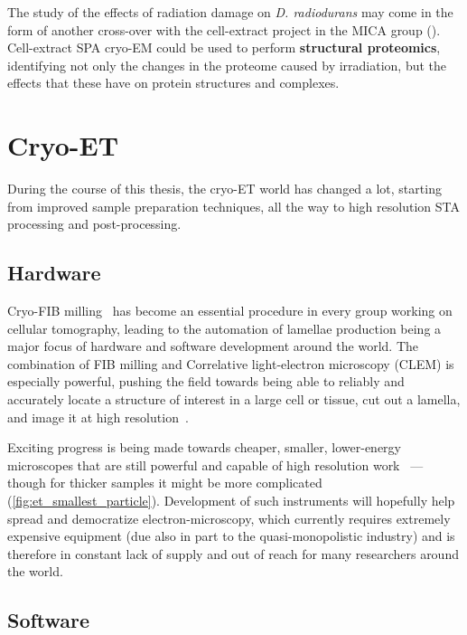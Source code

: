 The study of the effects of radiation damage on \textit{D. radiodurans} may come in the form of another cross-over with the cell-extract project in the MICA group ().
Cell-extract SPA cryo-EM could be used to perform \textbf{structural proteomics}, identifying not only the changes in the proteome caused by irradiation, but the effects that these have on protein structures and complexes.


\section{Cryo-ET}

During the course of this thesis, the cryo-ET world has changed a lot, starting from improved sample preparation techniques, all the way to high resolution STA processing and post-processing.

\subsection{Hardware}

Cryo-FIB milling~\cite{markoFocusedionbeamThinningFrozenhydrated2007} has become an essential procedure in every group working on cellular tomography, leading to the automation of lamellae production being a major focus of hardware and software development around the world.
The combination of FIB milling and Correlative light-electron microscopy (CLEM) is especially powerful, pushing the field towards being able to reliably and accurately locate a structure of interest in a large cell or tissue, cut out a lamella, and image it at high resolution~\cite{bergerCryoelectronTomographyFocused2023,debeerPreciseTargeting3D2023,klumpeModularPlatformAutomated2021}.

Exciting progress is being made towards cheaper, smaller, lower-energy microscopes that are still powerful and capable of high resolution work~\cite{naydenovaCryoEM100KeV2019,russoElectronCryomicroscopeHardware2023} --- though for thicker samples it might be more complicated (\autoref{fig:et_smallest_particle}).
Development of such instruments will hopefully help spread and democratize electron-microscopy, which currently requires extremely expensive equipment (due also in part to the quasi-monopolistic industry) and is therefore in constant lack of supply and out of reach for many researchers around the world.


\subsection{Software}

